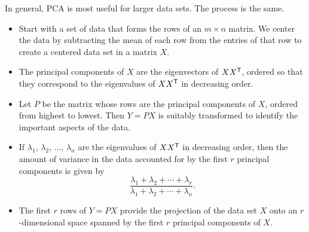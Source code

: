In general, PCA is most useful for larger data sets. The process is the same. 
\begin{itemize}
\item Start with a set of data that forms the rows of an $m \times n$ matrix. We center the data by subtracting the mean of each row from the entries of that row to create a centered data set in a matrix $X$. 
\item The principal components of $X$ are the eigenvectors of $XX^{\mathsf{T}}$, ordered so that they correspond to the eigenvalues of $XX^{\mathsf{T}}$ in decreasing order. 
\item Let $P$ be the matrix whose rows are the principal components of $X$, ordered from highest to lowest. Then $Y = PX$ is suitably transformed to identify the important aspects of the data. 
\item If $\lambda_1$, $\lambda_2$, $\ldots$, $\lambda_n$ are the eigenvalues of $XX^{\mathsf{T}}$ in decreasing order, then the amount of variance in the data accounted for by the first $r$ principal components is given by
\[\frac{\lambda_1+\lambda_2 + \cdots + \lambda_r}{\lambda_1+\lambda_2 + \cdots + \lambda_n}.\]
\item The first $r$ rows of $Y=PX$ provide the projection of the data set $X$ onto an $r$-dimensional space spanned by the first $r$ principal components of $X$.  
\end{itemize}


